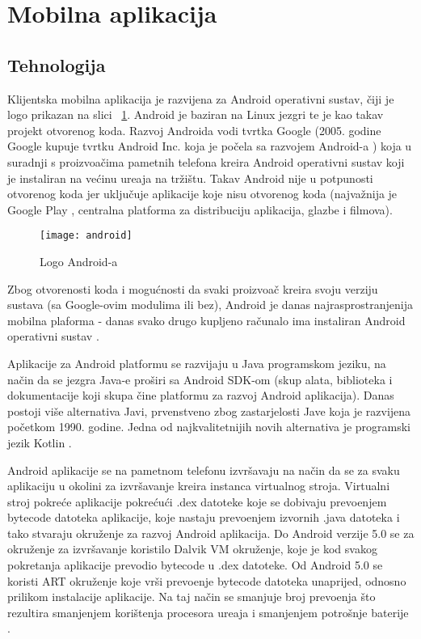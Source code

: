 \section{Mobilna aplikacija}

\subsection{Tehnologija}
Klijentska mobilna aplikacija je razvijena za Android operativni sustav, \v{c}iji je logo prikazan na slici ~\ref{fig:android}. Android je baziran na Linux jezgri te je kao takav projekt otvorenog koda. Razvoj Androida vodi tvrtka Google (2005. godine Google kupuje tvrtku Android Inc. koja je po\v{c}ela sa razvojem Android-a \cite{kupnjaAndroida}) koja u suradnji s proizvo\dj a\v{c}ima pametnih telefona kreira Android operativni sustav koji je instaliran na ve\'{c}inu ure\dj aja na tr\v{z}i\v{s}tu.
Takav Android nije u potpunosti otvorenog koda jer uklju\v{c}uje aplikacije koje nisu otvorenog koda (najva\v{z}nija je Google Play \cite{googlePlay}, centralna platforma za distribuciju aplikacija, glazbe i filmova).

\begin{figure}[!htbp]
	\begin{center}
 \texttt{[image: android]}
 \caption{Logo Android-a}
 \label{fig:android}
	\end{center}
\end{figure}

Zbog otvorenosti koda i mogu\'{c}nosti da svaki proizvo\dj a\v{c} kreira svoju verziju sustava (sa Google-ovim modulima ili bez), Android je danas najrasprostranjenija mobilna plaforma - danas svako drugo kupljeno ra\v{c}unalo ima instaliran Android operativni sustav \cite{androidDominacija}.

Aplikacije za Android platformu se razvijaju u Java programskom jeziku, na na\v{c}in da se jezgra Java-e pro\v{s}iri sa Android SDK-om (skup alata, biblioteka i dokumentacije koji skupa \v{c}ine platformu za razvoj Android aplikacija). Danas postoji vi\v{s}e alternativa Javi, prvenstveno zbog zastarjelosti Jave koja je razvijena po\v{c}etkom 1990. godine. Jedna od najkvalitetnijih novih alternativa je programski jezik Kotlin \cite{kotlin}. 

Android aplikacije se na pametnom telefonu izvr\v{s}avaju na na\v{c}in da se za svaku aplikaciju u okolini za izvr\v{s}avanje kreira instanca virtualnog stroja. 
Virtualni stroj pokre\'{c}e aplikacije pokre\'{c}u\'{c}i .dex datoteke koje se dobivaju prevo\dj enjem bytecode datoteka aplikacije, koje nastaju prevo\dj enjem izvornih .java datoteka i tako stvaraju okru\v{z}enje za razvoj Android aplikacija. Do Android verzije 5.0 se za okru\v{z}enje za izvr\v{s}avanje koristilo Dalvik VM okru\v{z}enje, koje je kod svakog pokretanja aplikacije prevodio bytecode u .dex datoteke. Od Android 5.0 se koristi ART okru\v{z}enje koje vr\v{s}i prevo\dj enje bytecode datoteka unaprijed, odnosno prilikom instalacije aplikacije. Na taj na\v{c}in se smanjuje broj prevo\dj enja \v{s}to rezultira smanjenjem kori\v{s}tenja procesora ure\dj aja i smanjenjem potro\v{s}nje baterije \cite{dalvikArt}.



